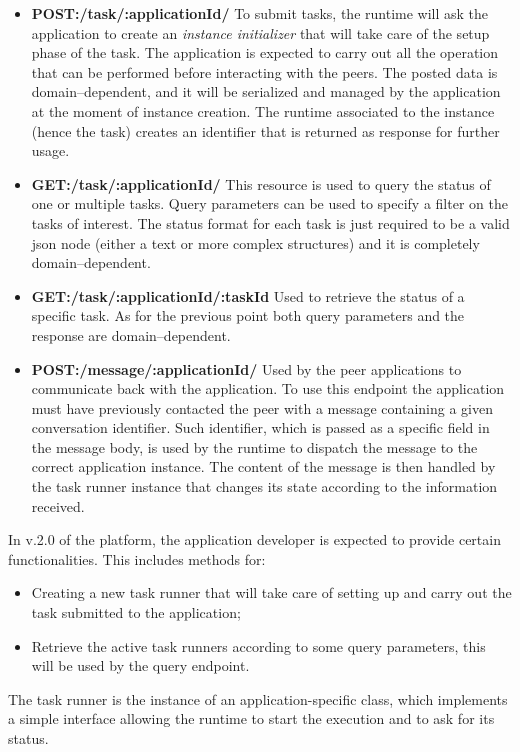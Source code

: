\begin{itemize}
\item {\bf POST:/task/:applicationId/} To submit tasks, the runtime will ask the application to create an \textit{instance initializer} that will take care of the setup phase of the task. The application is expected to carry out all the operation that can be performed before interacting with the peers. The posted data is domain--dependent, and it will be serialized and managed by the application at the moment of instance creation. The runtime associated to the instance (hence the task) creates an identifier that is returned as response for further usage.

\item {\bf GET:/task/:applicationId/} This resource is used to query the status of one or multiple tasks. Query parameters can be used to specify a filter on the tasks of interest. 
The status format for each task is just required to be a valid json node (either a text or more complex structures) and it is completely domain--dependent. %

\item {\bf GET:/task/:applicationId/:taskId} Used to retrieve the status of a specific task. As for the previous point both query parameters and the response are domain--dependent.

\item {\bf POST:/message/:applicationId/} Used by the peer applications to communicate back with the application. To use this endpoint the application must have previously contacted the peer with a message containing a given conversation identifier. Such identifier, which is passed as a specific field in the message body, is used  by the runtime to dispatch the message to the correct application instance. The content of the message is then handled by the task runner instance that changes its state according to the information received.
\end{itemize}

In v.2.0 of the platform, the application developer is expected to provide certain functionalities. This includes methods for:
\begin{itemize}
 	\item Creating a new task runner that will take care of setting up and carry out the task submitted to the application;
 	\item Retrieve the active task runners according to some query parameters, this will be used by the query endpoint.
\end{itemize}
The task runner is the instance of an application-specific class, which implements a simple interface allowing the runtime to start the execution and to ask for its status.


